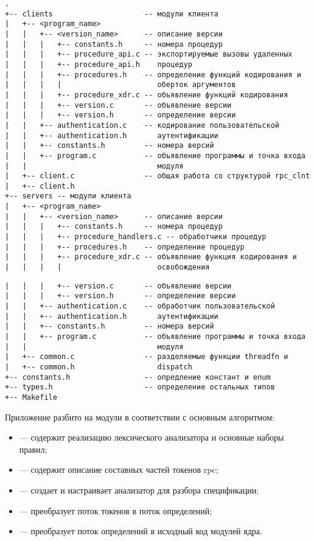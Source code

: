 \begin{lstlisting}[caption={Организаци кода модулей ядра (часть 1)}, label={lst:c_mod_structure1}]
.
+-- clients                     -- модули клиента
|   +-- <program_name>
|   |   +-- <version_name>      -- описание версии
|   |   |   +-- constants.h     -- номера процедур
|   |   |   +-- procedure_api.c -- экспортируемые вызовы удаленных
|   |   |   +-- procedure_api.h    процедур
|   |   |   +-- procedures.h    -- определение функций кодирования и
|   |   |   |                      оберток аргументов
|   |   |   +-- procedure_xdr.c -- объявление функций кодирования
|   |   |   +-- version.c       -- объявление версии
|   |   |   +-- version.h       -- определение версии
|   |   +-- authentication.c    -- кодирование пользовательской
|   |   +-- authentication.h       аутентификации
|   |   +-- constants.h         -- номера версий
|   |   +-- program.c           -- объявление программы и точка входа
|   |                              модуля
|   +-- client.c                -- общая работа со структурой rpc_clnt
|   +-- client.h
+-- servers -- модули клиента
|   +-- <program_name>
|   |   +-- <version_name>      -- описание версии
|   |   |   +-- constants.h     -- номера процедур
|   |   |   +-- procedure_handlers.c -- обработчики процедур
|   |   |   +-- procedures.h    -- определение процедур
|   |   |   +-- procedure_xdr.c -- объявление функция кодирования и
|   |   |   |                      освобождения
\end{lstlisting}
\clearpage
\begin{lstlisting}[caption={Организаци кода модулей ядра (часть 2)}, label={lst:c_mod_structure2}]
|   |   |   +-- version.c       -- объявление версии
|   |   |   +-- version.h       -- определение версии
|   |   +-- authentication.c    -- обработчик пользовательской
|   |   +-- authentication.h       аутентификации
|   |   +-- constants.h         -- номера версий
|   |   +-- program.c           -- объявление программы и точка входа
|   |                              модуля
|   +-- common.c                -- разделяемые функции threadfn и
|   +-- common.h                   dispatch
+-- constants.h                 -- опредление констант и enum
+-- types.h                     -- определение остальных типов
+-- Makefile
\end{lstlisting}

Приложение разбито на модули в соответствии с основным алгоритмом:
\begin{itemize}
    \item {} --- содержит реализацию лексического анализатора и
          основные наборы правил;
    \item {} --- содержит описание составных частей токенов rpc;
    \item {} --- создает и настраивает анализатор для разбора
          спецификации;
    \item {} --- преобразует поток токенов в поток определений;
    \item {} --- преобразует поток определений в исходный
          код модулей ядра.
\end{itemize}

